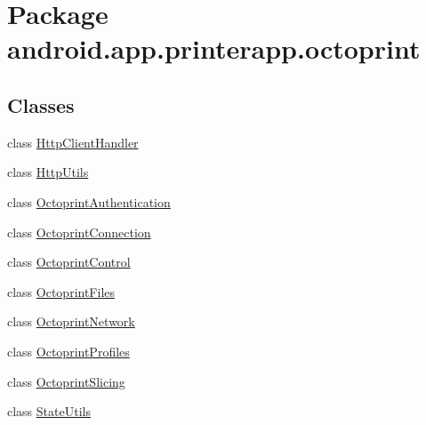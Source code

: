 \hypertarget{namespaceandroid_1_1app_1_1printerapp_1_1octoprint}{}\section{Package android.\+app.\+printerapp.\+octoprint}
\label{namespaceandroid_1_1app_1_1printerapp_1_1octoprint}
\subsection*{Classes}
\begin{DoxyCompactItemize}
\item 
class \hyperlink{classandroid_1_1app_1_1printerapp_1_1octoprint_1_1_http_client_handler}{Http\+Client\+Handler}
\item 
class \hyperlink{classandroid_1_1app_1_1printerapp_1_1octoprint_1_1_http_utils}{Http\+Utils}
\item 
class \hyperlink{classandroid_1_1app_1_1printerapp_1_1octoprint_1_1_octoprint_authentication}{Octoprint\+Authentication}
\item 
class \hyperlink{classandroid_1_1app_1_1printerapp_1_1octoprint_1_1_octoprint_connection}{Octoprint\+Connection}
\item 
class \hyperlink{classandroid_1_1app_1_1printerapp_1_1octoprint_1_1_octoprint_control}{Octoprint\+Control}
\item 
class \hyperlink{classandroid_1_1app_1_1printerapp_1_1octoprint_1_1_octoprint_files}{Octoprint\+Files}
\item 
class \hyperlink{classandroid_1_1app_1_1printerapp_1_1octoprint_1_1_octoprint_network}{Octoprint\+Network}
\item 
class \hyperlink{classandroid_1_1app_1_1printerapp_1_1octoprint_1_1_octoprint_profiles}{Octoprint\+Profiles}
\item 
class \hyperlink{classandroid_1_1app_1_1printerapp_1_1octoprint_1_1_octoprint_slicing}{Octoprint\+Slicing}
\item 
class \hyperlink{classandroid_1_1app_1_1printerapp_1_1octoprint_1_1_state_utils}{State\+Utils}
\end{DoxyCompactItemize}
